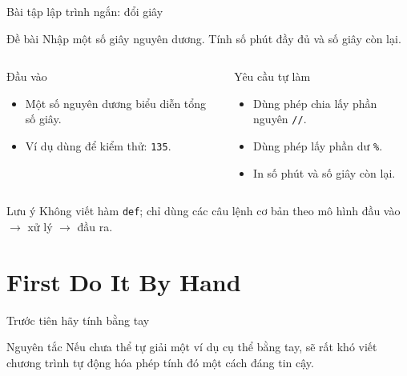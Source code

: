 \documentclass[aspectratio=169,10pt]{beamer}
\begin{document}
\begin{frame}[fragile]{Bài tập lập trình ngắn: đổi giây}
\small
\begin{block}{Đề bài}
Nhập một số giây nguyên dương. Tính số phút đầy đủ và số giây còn lại.
\end{block}
\begin{columns}[T,onlytextwidth]
\begin{block}{Đầu vào}
\begin{itemize}
  \item Một số nguyên dương biểu diễn tổng số giây.
  \item Ví dụ dùng để kiểm thử: \texttt{135}.
\end{itemize}
\end{block}
\begin{block}{Yêu cầu tự làm}
\begin{itemize}
  \item Dùng phép chia lấy phần nguyên \texttt{//}.
  \item Dùng phép lấy phần dư \texttt{\%}.
  \item In số phút và số giây còn lại.
\end{itemize}
\end{block}
\end{columns}
\begin{alertblock}{Lưu ý}
Không viết hàm \texttt{def}; chỉ dùng các câu lệnh cơ bản theo mô hình đầu vào $\rightarrow$ xử lý $\rightarrow$ đầu ra.
\end{alertblock}
\end{frame}

\section{First Do It By Hand}

\begin{frame}{Trước tiên hãy tính bằng tay}
\begin{alertblock}{Nguyên tắc}
Nếu chưa thể tự giải một ví dụ cụ thể bằng tay, sẽ rất khó viết chương trình tự động hóa phép tính đó một cách đáng tin cậy.
\end{alertblock}
\begin{center}
\end{center}
\end{frame}
\end{document}
